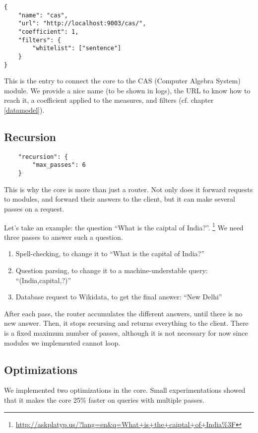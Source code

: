 \begin{verbatim}
{
    "name": "cas",
    "url": "http://localhost:9003/cas/",
    "coefficient": 1,
    "filters": {
        "whitelist": ["sentence"]
    }
}
\end{verbatim}

This is the entry to connect the core to the CAS (Computer Algebra System)
module. We provide a nice name (to be
shown in logs), the URL to know how to reach it, a coefficient applied to
the measures, and filters (cf. chapter \ref{datamodel}).

\subsection{Recursion}

\begin{verbatim}
    "recursion": {
        "max_passes": 6
    }
\end{verbatim}

This is why the core is more than just a router. Not only does it forward
requests to modules, and forward their answers to the client, but it can
make several passes on a request.

Let's take an example: the question “What is the caiptal of India?”.
\footnote{\url{http://askplatyp.us/?lang=en&q=What+is+the+caiptal+of+India\%3F}}
We need three passes to answer such a question.

\begin{enumerate}
    \item Spell-checking, to change it to “What is the capital of India?”
    \item Question parsing, to change it to a machine-understable query:
        “(India,capital,?)”
    \item Database request to Wikidata, to get the final answer:
        “New Delhi”
\end{enumerate}

After each pass, the router accumulates the different answers, until
there is no new answer. Then, it stops recursing and returns everything
to the client.
There is a fixed maximum number of passes, although it is not necessary
for now since modules we implemented cannot loop.

\subsection{Optimizations}

We implemented two optimizations in the core. Small experimentations showed that
it makes the core 25\% faster on queries with multiple passes.

